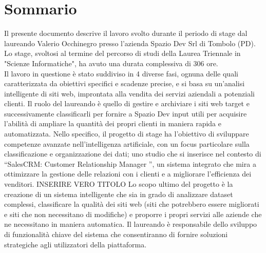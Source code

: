 \cleardoublepage
{}
{}
\begingroup
\let\clearpage\relax
\let\cleardoublepage\relax
\let\cleardoublepage\relax

\chapter*{Sommario}

Il presente documento descrive il lavoro svolto durante il periodo di stage dal laureando
Valerio Occhinegro presso l’azienda Spazio Dev Srl di Tombolo (PD). Lo stage, svoltosi al termine del percorso di studi della Laurea Triennale in "Scienze Informatiche", ha avuto una durata complessiva di 306 ore.\\
Il lavoro in questione è stato suddiviso in 4 diverse fasi, ognuna delle quali caratterizzata da obiettivi specifici e scadenze precise, e si basa su un'analisi intelligente di siti web, improntata alla vendita dei servizi aziendali a potenziali clienti. Il ruolo del laureando è quello di gestire e archiviare i siti web target e successivamente classificarli per fornire a Spazio Dev input utili per acquisire l'abilità di ampliare la quantità dei propri clienti in maniera rapida e automatizzata. 
Nello specifico, il progetto di stage ha l’obiettivo di sviluppare competenze avanzate nell’intelligenza artificiale, con un focus
particolare sulla classificazione e organizzazione dei dati; uno studio che si inserisce nel contesto di
{“SalesCRM: Customer Relationship Manager ”, un sistema integrato che mira a ottimizzare la gestione delle relazioni con i clienti e a migliorare l’efficienza dei venditori.} INSERIRE VERO TITOLO
Lo scopo ultimo del progetto è la creazione di un sistema intelligente che sia in grado di analizzare dataset complessi,
classificare la qualità dei siti web (siti che potrebbero essere migliorati e siti che non necessitano di modifiche) e proporre i propri servizi alle aziende che ne necessitano in maniera automatica. 
Il laureando è responsabile dello sviluppo di funzionalità chiave del sistema che consentiranno di fornire
soluzioni strategiche agli utilizzatori della piattaforma. 






\endgroup

\vfill
